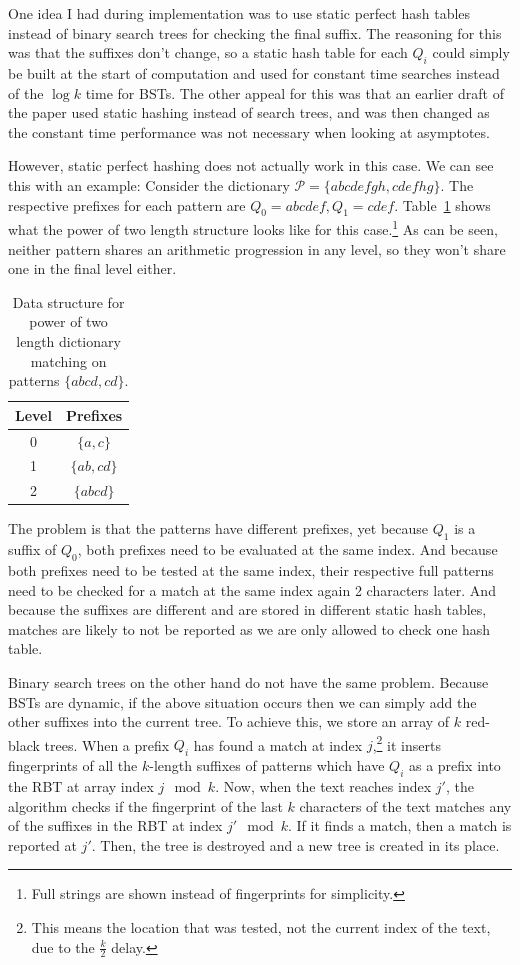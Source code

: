 \documentclass[ %
                    author={Dominic Joseph Moylett},
                    degree={MEng},
                     title={Dictionary Matching with Fingerprints},
                  subtitle={An Empirical Analysis},
                      type={research},
                      year={2015} ]{dissertation}
\begin{document}
One idea I had during implementation was to use static perfect hash tables instead of binary search trees for checking the final suffix. The reasoning for this was that the suffixes don't change, so a static hash table for each $Q_i$ could simply be built at the start of computation and used for constant time searches instead of the $\log k$ time for BSTs. The other appeal for this was that an earlier draft of the paper used static hashing instead of search trees, and was then changed as the constant time performance was not necessary when looking at asymptotes.

However, static perfect hashing does not actually work in this case. We can see this with an example: Consider the dictionary $\mathcal{P} = \{abcdefgh, cdefhg\}$. The respective prefixes for each pattern are $Q_0 = abcdef, Q_1 = cdef$. Table~\ref{tab:static-hash-fail} shows what the power of two length structure looks like for this case.\footnote{Full strings are shown instead of fingerprints for simplicity.} As can be seen, neither pattern shares an arithmetic progression in any level, so they won't share one in the final level either.

\begin{table}[t]
  \centering
  \begin{tabular}{|c|c|}
    \hline
    Level & Prefixes \\\hline
    0 & $\{a, c\}$ \\\hline
    1 & $\{ab, cd\}$ \\\hline
    2 & $\{abcd\}$ \\\hline
  \end{tabular}
  \caption{Data structure for power of two length dictionary matching on patterns $\{abcd, cd\}$.}
  \label{tab:static-hash-fail}
\end{table}

The problem is that the patterns have different prefixes, yet because $Q_1$ is a suffix of $Q_0$, both prefixes need to be evaluated at the same index. And because both prefixes need to be tested at the same index, their respective full patterns need to be checked for a match at the same index again 2 characters later. And because the suffixes are different and are stored in different static hash tables, matches are likely to not be reported as we are only allowed to check one hash table.

Binary search trees on the other hand do not have the same problem. Because BSTs are dynamic, if the above situation occurs then we can simply add the other suffixes into the current tree. To achieve this, we store an array of $k$ red-black trees. When a prefix $Q_i$ has found a match at index $j$,\footnote{This means the location that was tested, not the current index of the text, due to the $\frac{k}{2}$ delay.} it inserts fingerprints of all the $k$-length suffixes of patterns which have $Q_i$ as a prefix into the RBT at array index $j \mod k$. Now, when the text reaches index $j'$, the algorithm checks if the fingerprint of the last $k$ characters of the text matches any of the suffixes in the RBT at index $j' \mod k$. If it finds a match, then a match is reported at $j'$. Then, the tree is destroyed and a new tree is created in its place.
\end{document}
